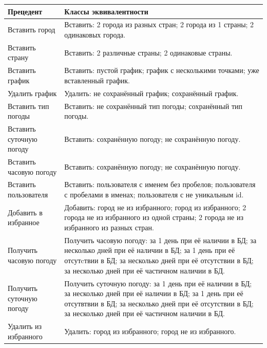 \begin{longtable}{ | m{65mm} | m{18em}| }
    \hline
        \textbf{Прецедент} & \textbf{Классы эквивалентности} \\
    \hline
        Вставить город & Вставить: 2 города из разных стран; 2 города из 1 страны; 2 одинаковых города. \\
    \hline
        Вставить страну & Вставить: 2 различные страны; 2 одинаковые страны.  \\
    \hline
        Вставить график & Вставить: пустой график; график с несколькими точками; уже вставленный график. \\
    \hline
        Удалить график & Удалить: не сохранённый график; сохранённый график. \\
    \hline
        Вставить тип погоды & Вставить: не сохранённый тип погоды; сохранённый тип погоды. \\
    \hline
        Вставить суточную погоду & Вставить: сохранённую погоду; не сохранённую погоду. \\
    \hline
        Вставить часовую погоду & Вставить: сохранённую погоду; не сохранённую погоду. \\
    \hline
        Вставить пользователя & Вставить: пользователя с именем без пробелов; пользователя с пробелами в именах; пользователя с не уникальным id. \\
    \hline
        Добавить в избранное  & Добавить: город не из избранного; город из избранного; 2 города не из избранного из одной страны; 2 города не из избранного из разных стран. \\
    \hline
        Получить часовую погоду & Получить часовую погоду: за 1 день при её наличии в БД; за несколько дней при её наличии в БД; за 1 день при её отсутcтвии в БД; за несколько дней при её отсутствии в БД; за несколько дней при её частичном наличии в БД.  \\
    \hline
        Получить суточную погоду & Получить суточную погоду: за 1 день при её наличии в БД; за несколько дней при её наличии в БД; за 1 день при её отсутвтвии в БД; за несколько дней при её отсутствии в БД; за несколько дней при её частичном наличии в БД. \\
    \hline
        Удалить из избранного  & Удалить: город из избранного; город не из избранного. \\
    \hline
    \endfirsthead
    

\end{longtable}
